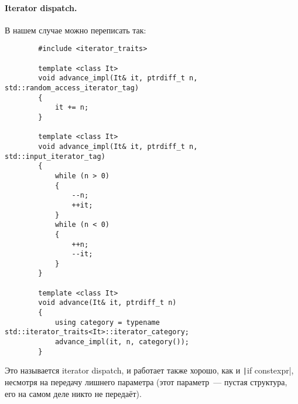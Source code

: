 \documentclass{article}
\begin{document}
    \paragraph{Iterator dispatch.}
    В нашем случае можно переписать так:
    \begin{verbatim}
        #include <iterator_traits>

        template <class It>
        void advance_impl(It& it, ptrdiff_t n, std::random_access_iterator_tag)
        {
            it += n;
        }

        template <class It>
        void advance_impl(It& it, ptrdiff_t n, std::input_iterator_tag)
        {
            while (n > 0)
            {
                --n;
                ++it;
            }
            while (n < 0)
            {
                ++n;
                --it;
            }
        }

        template <class It>
        void advance(It& it, ptrdiff_t n)
        {
            using category = typename std::iterator_traits<It>::iterator_category;
            advance_impl(it, n, category());
        }
    \end{verbatim}
    Это называется iterator dispatch, и работает также хорошо, как и \texttt|if constexpr|, несмотря на передачу лишнего параметра (этот параметр~--- пустая структура, его на самом деле никто не передаёт).
\end{document}
